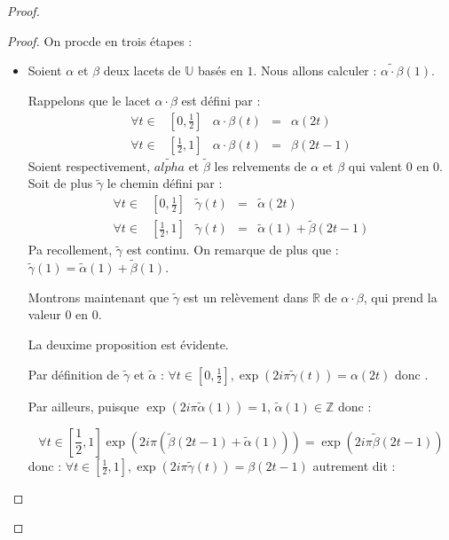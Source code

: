 \begin{proof}
\begin{proof}
On procde en trois \'etapes :
\begin{itemize}
\item[\textit{Propri\'et\'e de morphisme :}]
Soient $\alpha$ et $\beta$ deux lacets de $\mathbb{U}$ bas\'es en $1$. Nous allons calculer : $\tilde{\alpha\cdot\beta} (1)$.

Rappelons que le lacet $\alpha\cdot\beta$ est d\'efini par :
\[
\begin{array}{rcccl}
\forall t\in&\left[0,\frac{1}{2}\right]&\alpha\cdot\beta (t)&=&\alpha (2t)\\[1ex]
\forall t\in&\left[\frac{1}{2},1\right]&\alpha\cdot\beta (t)&=&\beta (2t-1)
\end{array}
\]
Soient respectivement, $\tilde{alpha}$ et $\tilde{\beta}$ les relvements de $\alpha$ et $\beta$ qui valent $0$ en $0$. Soit de plus $\tilde{\gamma}$ le chemin d\'efini par :
\[
\begin{array}{rcccl}
\forall t\in&\left[0,\frac{1}{2}\right]&\tilde{\gamma} (t)&=&\tilde{\alpha} (2t)\\[1ex]
\forall t\in&\left[\frac{1}{2},1\right]&\tilde{\gamma} (t)&=&\tilde{\alpha}(1)+\tilde{\beta} (2t-1)
\end{array}
\]
Pa recollement, $\tilde{\gamma}$ est continu. On remarque de plus que : $\tilde{\gamma}(1)=\tilde{\alpha}(1)+\tilde{\beta}(1)$.

\par
Montrons maintenant que $\tilde{\gamma}$ est un rel\`evement dans $\mathbb{R}$ de $\alpha\cdot\beta$, qui prend la valeur $0$ en $0$.

\par
La deuxime proposition est \'evidente.

\par
Par d\'efinition de $\tilde{\gamma}$ et $\tilde{\alpha}$ : $\forall t\in\left[0,\frac{1}{2}\right],\exp (2i\pi\tilde{\gamma}(t))=\alpha (2t)$ donc %
.

\par
Par ailleurs, puisque $\exp (2i\pi\tilde{\alpha}(1))=1$, $\tilde{\alpha}(1)\in\mathbb{Z}$ donc :

\[\forall t\in\left[\frac{1}{2},1\right]\exp (2i\pi(\tilde{\beta}(2t-1)+\tilde{\alpha}(1)))=\exp(2i\pi\tilde{\beta}(2t-1))\]
donc : $\forall t\in\left[\frac{1}{2},1\right],\exp (2i\pi \tilde{\gamma}(t))=\beta (2t-1)$ %
autrement dit : 


\end{itemize}
\end{proof}
\end{proof}
